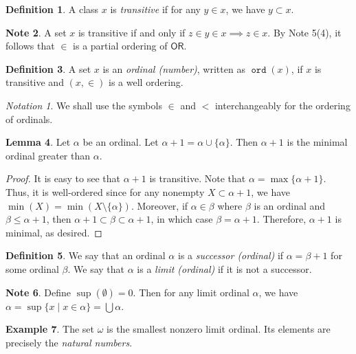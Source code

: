 \documentclass[10pt,letterpaper,cm]{nupset}
\theoremstyle{definition}
\newtheorem{definition}{Definition}[subsection]
\newtheorem{exmp}[definition]{Example}
\newtheorem{note}[definition]{Note}
\theoremstyle{theorem}
\newtheorem{lemma}[definition]{Lemma}
\theoremstyle{remark}
\newtheorem*{notation}{Notation}
\newcommand{\1}{\mathbf{1}}
\newcommand{\0}{\vec 0}
\newcommand{\ord}{\mathsf{OR}}
\DeclareMathOperator{\od}{\mathtt{ord}}
\begin{document}
\begin{definition}
A class $x$ is \textit{transitive} if for any $y\in x$, we have $y\subset x$.
\end{definition}

\begin{note}
A set $x$ is transitive if and only if $z \in y \in x \implies z\in x$. By Note 5(4), it follows that $\in$ is a partial ordering of $\ord$.
\end{note}

\begin{definition}
A set $x$ is an \textit{ordinal (number)}, written as $\od(x)$, if $x$ is transitive and $\left(x, \in\right)$ is a well ordering. 
\end{definition}

\begin{notation}
We shall use the symbols $\in$ and $<$ interchangeably for the ordering of ordinals. 
\end{notation}

\begin{lemma}
Let $\alpha$ be an ordinal. Let $\alpha +1 = \alpha \cup \{\alpha \}$. Then $\alpha +1$ is the minimal ordinal greater than $\alpha$. 
\end{lemma}
\begin{proof}
It is easy to see that $\alpha +1$ is transitive. Note that $\alpha  = \max\{\alpha +1\}$. Thus, it is well-ordered since for any nonempty $X \subset \alpha +1$, we have $\min(X) = \min(X \setminus \{\alpha \})$. Moreover, if $\alpha \in \beta$ where $\beta$ is an ordinal and $\beta \leq \alpha +1$, then $\alpha + 1 \subset \beta \subset \alpha +1$, in which case $\beta = \alpha +1$. Therefore, $\alpha +1$ is minimal, as desired. 
\end{proof}

\begin{definition}
We say that an ordinal $\alpha$ is a \textit{successor (ordinal)} if $\alpha = \beta +1$ for some ordinal $\beta$. We say that $\alpha$ is a \textit{limit (ordinal)} if it is not a successor.
\end{definition}

\begin{note}
Define $\sup(\emptyset) = 0$. Then for any limit ordinal $\alpha$, we have $\alpha = \sup\{x\mid x \in \alpha\} = \bigcup{\alpha}.$
\end{note}

\begin{exmp}
The set $\omega$ is  the smallest nonzero limit ordinal. Its elements are precisely the \textit{natural numbers}.
\end{exmp}
\end{document}
